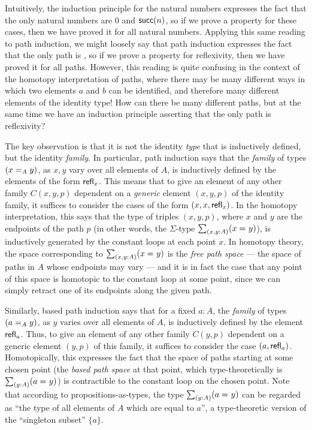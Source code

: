 \begin{rmk}
Intuitively, the induction principle for the natural numbers expresses the fact that the only natural numbers are $0$ and $\suc(n)$, so if we prove a property for these cases, then we have proved it for all natural numbers.  Applying this same reading to path induction, we might loosely say that path induction expresses the fact that the only path is , so if we prove a property for reflexivity, then we have proved it for all paths.  However, this reading is quite confusing in the context of the homotopy interpretation of paths, where there may be many different ways in which two elements $a$ and $b$ can be identified, and therefore many different elements of the identity type!  How can there be many different paths, but at the same time we have an induction principle asserting that the only path is reflexivity?

The key observation is that it is not the identity \emph{type} that is inductively defined, but the identity \emph{family}.
In particular, path induction says that the \emph{family} of types $(\id[A]{x}{y})$, as $x,y$ vary over all elements of $A$, is inductively defined by the elements of the form $\refl{x}$.
This means that to give an element of any other family $C(x,y,p)$ dependent on a \emph{generic} element $(x,y,p)$ of the identity family, it suffices to consider the cases of the form $(x,x,\refl{x})$.
In the homotopy interpretation, this says that the type of triples $(x,y,p)$, where $x$ and $y$ are the endpoints of the path $p$ (in other words, the $\Sigma$-type $\sm{x,y:A}(\id{x}{y})$), is inductively generated by the constant loops at each point $x$.
In homotopy theory, the space corresponding to $\sm{x,y:A}(\id{x}{y})$ is the \emph{free path space} --- the space of paths in $A$ whose endpoints may vary --- and it is in fact the case that any point of this space is homotopic to the constant loop at some point, since we can simply retract one of its endpoints along the given path.

Similarly, based path induction says that for a fixed $a:A$, the \emph{family} of types $(\id[A]{a}{y})$, as $y$ varies over all elements of $A$, is inductively defined by the element $\refl{a}$.
Thus, to give an element of any other family $C(y,p)$ dependent on a generic element $(y,p)$ of this family, it suffices to consider the case $(a,\refl{a})$.
Homotopically, this expresses the fact that the space of paths starting at some chosen point (the \emph{based path space} at that point, which type-theoretically is $\sm{y:A} (\id{a}{y})$) is contractible to the constant loop on the chosen point.
Note that according to propositions-as-types, the type $\sm{y:A}(\id{a}{y})$ can be regarded as ``the type of all elements of $A$ which are equal to $a$'', a type-theoretic version of the ``singleton subset'' $\{a\}$.


\end{rmk}
